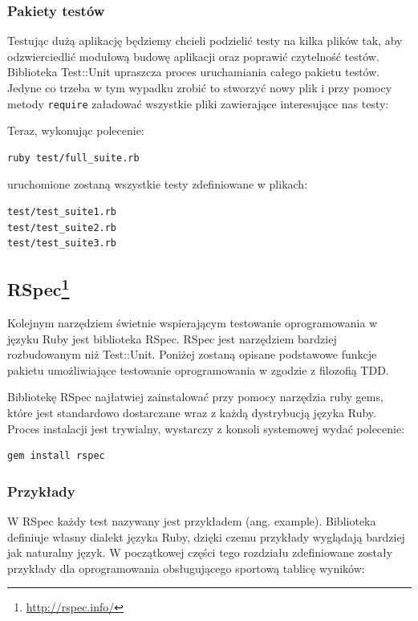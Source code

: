     \subsubsection{Pakiety testów}
    Testując dużą aplikację będziemy chcieli podzielić testy na kilka plików tak, aby odzwierciedlić modułową budowę aplikacji oraz poprawić czytelność testów. Biblioteka Test::Unit upraszcza proces uruchamiania całego pakietu testów. Jedyne co trzeba w tym wypadku zrobić to stworzyć nowy plik i przy pomocy metody \texttt{require} załadować wszystkie pliki zawierające interesujące nas testy:
    
    
    
    Teraz, wykonując polecenie:
    
\begin{lstlisting} 
ruby test/full_suite.rb
\end{lstlisting}
    
    uruchomione zostaną wszystkie testy zdefiniowane w plikach:
    
\begin{lstlisting} 
test/test_suite1.rb
test/test_suite2.rb
test/test_suite3.rb
\end{lstlisting}
    
    \subsection[RSpec]{RSpec\footnote{\url{http://rspec.info/}\nocite{rspec}}}
    
    Kolejnym narzędziem świetnie wspierającym testowanie oprogramowania w języku Ruby jest biblioteka RSpec. RSpec jest narzędziem bardziej rozbudowanym niż Test::Unit. Poniżej zostaną opisane podstawowe funkcje pakietu umożliwiające testowanie oprogramowania w zgodzie z filozofią TDD.
    
    Bibliotekę RSpec najłatwiej zainstalować przy pomocy narzędzia ruby gems, które jest standardowo dostarczane wraz z każdą dystrybucją języka Ruby. Proces instalacji jest trywialny, wystarczy z konsoli systemowej wydać polecenie:
    
\begin{lstlisting}
gem install rspec
\end{lstlisting}
    
    \subsubsection{Przykłady}
    W RSpec każdy test nazywany jest przykładem (ang. example). Biblioteka definiuje własny dialekt języka Ruby, dzięki czemu przykłady wyglądają bardziej jak naturalny język. W początkowej części tego rozdziału zdefiniowane zostały przykłady dla oprogramowania obsługującego sportową tablicę wyników:
    
